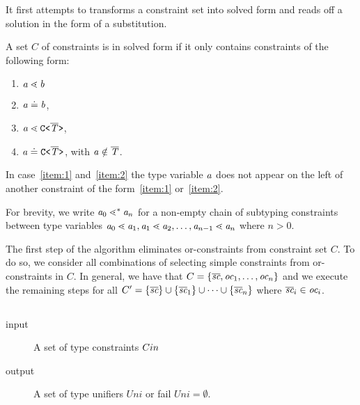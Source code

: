 \color{black}

It first attempts to transforms a constraint set into solved form and
reads off a solution in the form of a substitution.

\begin{definition}\label{def:solved-form}
  A set $C$ of constraints is in solved form if it only contains
  constraints of  the following form:
  \begin{enumerate}
  \item $\mathit{ a } \lessdot \mathit{ b }$ %
  \item $\mathit{ a } \doteq \mathit{ b }$,
  \item\label{item:1} $\mathit{ a } \lessdot \mathtt{C \texttt{<} \overline{\tt \mathit{T}} \texttt{>} }$, 
  \item\label{item:2} $\mathit{ a } \doteq \mathtt{C \texttt{<} \overline{\tt \mathit{T}} \texttt{>} }$, with $\mathit{ a } \notin \overline{\tt \mathit{T}}$.
  \end{enumerate}
  In case~\ref{item:1} and~\ref{item:2} the type variable $\mathit{ a }$ does not appear on the left of another constraint of the
  form~\ref{item:1} or~\ref{item:2}.
\end{definition}  

For brevity, we write $\mathit{ a }_0 \lessdot^* \mathit{ a }_n$ for a non-empty chain of subtyping constraints between type variables $\mathit{ a }_0 \lessdot
\mathit{ a }_1, \mathit{ a }_1 \lessdot \mathit{ a }_2, \dots, \mathit{ a }_{n-1} \lessdot \mathit{ a }_n$ where $n>0$.


The first step of the algorithm eliminates or-constraints from constraint set $C$. To do so,
we consider all combinations of selecting simple constraints from
or-constraints in $C$. In general, we have that $C =
\{ \overline{\textit{sc}}, \textit{oc}_1, \dots, \textit{oc}_n \}$ and we
execute the remaining steps for all $C' = \{ \overline{\textit{sc}} \}
\cup \{ \overline{\textit{sc}}_1 \} \cup \dots \cup
\{ \overline{\textit{sc}}_n \}$ where $\overline{\textit{sc}}_i \in
\textit{oc}_i$. 


\subsection{}
\begin{description}
\item[input] A set of type constraints $C{in}$ %
\item[output] A set of type unifiers $Uni$
or fail $Uni = \emptyset$.
\end{description}

